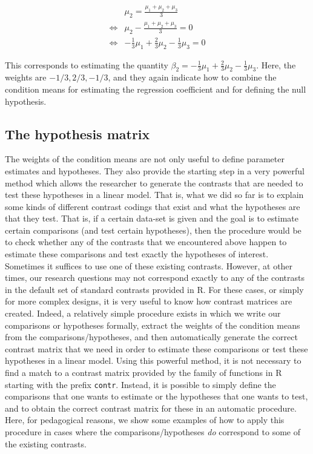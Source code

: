 \documentclass[12pt,]{krantz}
\begin{document}
\begin{align}\label{h02}
&  \mu_2 = \frac{\mu_1+\mu_2+\mu_3}{3}\\
\Leftrightarrow & \mu_2 - \frac{\mu_1+\mu_2+\mu_3}{3} = 0 \\
\Leftrightarrow & -\frac{1}{3}\mu_1 + \frac{2}{3} \mu_2 - \frac{1}{3} \mu_3 = 0
\end{align}

\noindent
This corresponds to estimating the quantity \(\beta_2 = -\frac{1}{3}\mu_1 + \frac{2}{3} \mu_2 - \frac{1}{3} \mu_3\).
Here, the weights are \(-1/3, 2/3, -1/3\), and they again indicate how to combine the condition means for estimating the regression coefficient and for defining the null hypothesis.

\hypertarget{the-hypothesis-matrix}{%
\subsection{The hypothesis matrix}\label{the-hypothesis-matrix}}

The weights of the condition means are not only useful to define parameter estimates and hypotheses. They also provide the starting step in a very powerful method which allows the researcher to generate the contrasts that are needed to test these hypotheses in a linear model. That is, what we did so far is to explain some kinds of different contrast codings that exist and what the hypotheses are that they test. That is, if a certain data-set is given and the goal is to estimate certain comparisons (and test certain hypotheses), then the procedure would be to check whether any of the contrasts that we encountered above happen to estimate these comparisons and test exactly the hypotheses of interest. Sometimes it suffices to use one of these existing contrasts. However, at other times, our research questions may not correspond exactly to any of the contrasts in the default set of standard contrasts provided in R. For these cases, or simply for more complex designs, it is very useful to know how contrast matrices are created. Indeed, a relatively simple procedure exists in which we write our comparisons or hypotheses formally, extract the weights of the condition means from the comparisons/hypotheses, and then automatically generate the correct contrast matrix that we need in order to estimate these comparisons or test these hypotheses in a linear model. Using this powerful method, it is not necessary to find a match to a contrast matrix provided by the family of functions in R starting with the prefix \texttt{contr}. Instead, it is possible to simply define the comparisons that one wants to estimate or the hypotheses that one wants to test, and to obtain the correct contrast matrix for these in an automatic procedure. Here, for pedagogical reasons, we show some examples of how to apply this procedure in cases where the comparisons/hypotheses \emph{do} correspond to some of the existing contrasts.
\end{document}
